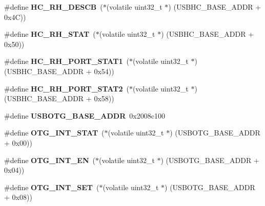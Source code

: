 \begin{DoxyCompactItemize}
\#define {\bfseries H\+C\+\_\+\+R\+H\+\_\+\+D\+E\+S\+CB}~($\ast$(volatile uint32\+\_\+t $\ast$) (U\+S\+B\+H\+C\+\_\+\+B\+A\+S\+E\+\_\+\+A\+D\+DR + 0x4\+C))
\item 
\mbox{\label{group__lpc24xx__regs_gab3c04e8b3462cda7c9e52e50914fa681}} 
\#define {\bfseries H\+C\+\_\+\+R\+H\+\_\+\+S\+T\+AT}~($\ast$(volatile uint32\+\_\+t $\ast$) (U\+S\+B\+H\+C\+\_\+\+B\+A\+S\+E\+\_\+\+A\+D\+DR + 0x50))
\item 
\mbox{\label{group__lpc24xx__regs_ga409581a3cb3f8fb1e1e01e9945a3fee7}} 
\#define {\bfseries H\+C\+\_\+\+R\+H\+\_\+\+P\+O\+R\+T\+\_\+\+S\+T\+A\+T1}~($\ast$(volatile uint32\+\_\+t $\ast$) (U\+S\+B\+H\+C\+\_\+\+B\+A\+S\+E\+\_\+\+A\+D\+DR + 0x54))
\item 
\mbox{\label{group__lpc24xx__regs_gab48910b294559f991d796902a7c15d03}} 
\#define {\bfseries H\+C\+\_\+\+R\+H\+\_\+\+P\+O\+R\+T\+\_\+\+S\+T\+A\+T2}~($\ast$(volatile uint32\+\_\+t $\ast$) (U\+S\+B\+H\+C\+\_\+\+B\+A\+S\+E\+\_\+\+A\+D\+DR + 0x58))
\item 
\mbox{\label{group__lpc24xx__regs_ga981e20c217de8ee858544795b021731c}} 
\#define {\bfseries U\+S\+B\+O\+T\+G\+\_\+\+B\+A\+S\+E\+\_\+\+A\+D\+DR}~0x2008c100
\item 
\mbox{\label{group__lpc24xx__regs_ga3ec9cd4028d4d8d795e44a79edef9105}} 
\#define {\bfseries O\+T\+G\+\_\+\+I\+N\+T\+\_\+\+S\+T\+AT}~($\ast$(volatile uint32\+\_\+t $\ast$) (U\+S\+B\+O\+T\+G\+\_\+\+B\+A\+S\+E\+\_\+\+A\+D\+DR + 0x00))
\item 
\mbox{\label{group__lpc24xx__regs_gab2eed48f8e0acf217541da7ec00c19de}} 
\#define {\bfseries O\+T\+G\+\_\+\+I\+N\+T\+\_\+\+EN}~($\ast$(volatile uint32\+\_\+t $\ast$) (U\+S\+B\+O\+T\+G\+\_\+\+B\+A\+S\+E\+\_\+\+A\+D\+DR + 0x04))
\item 
\mbox{\label{group__lpc24xx__regs_ga5b11a04230dcb96401b2e6c3f7795e77}} 
\#define {\bfseries O\+T\+G\+\_\+\+I\+N\+T\+\_\+\+S\+ET}~($\ast$(volatile uint32\+\_\+t $\ast$) (U\+S\+B\+O\+T\+G\+\_\+\+B\+A\+S\+E\+\_\+\+A\+D\+DR + 0x08))
\item 
\mbox{\label{group__lpc24xx__regs_ga72a0017456bd99076be2727c3e5335fe}} 

\end{DoxyCompactItemize}
